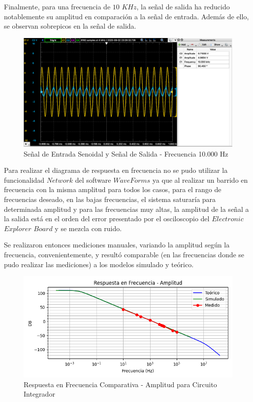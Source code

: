 Finalmente, para una frecuencia de $10$ $KHz$, la señal de salida ha reducido notablemente su amplitud en comparación a la señal de entrada.
Además de ello, se observan sobrepicos en la señal de salida.

\begin{figure}[H]
    \centering 
    \includegraphics [scale=0.4] {../Ejercicio3-CircuitoIntegradoresyDerivadores/Imagenes/senoidal - 10000.png} 
    \caption{Señal de Entrada Senoidal y Señal de Salida - Frecuencia 10.000 Hz}
    \label{fig:emptyPlotTool}
\end{figure}

Para realizar el diagrama de respuesta en frecuencia no se pudo utilizar la funcionalidad $Network$ del software $WaveForms$ ya que al realizar un barrido en frecuencia
con la misma amplitud para todos los casos, para el rango de frecuencias deseado, en las bajas frecuencias, el sistema saturaría para determinada amplitud y para las frecuencias muy altas, la amplitud de la señal a la salida
está en el orden del error presentado por el osciloscopio del $Electronic$ $Explorer$ $Board$ y se mezcla con ruido.

Se realizaron entonces mediciones manuales, variando la amplitud según la frecuencia, convenientemente, y resultó comparable (en las frecuencias donde se pudo realizar las mediciones)
a los modelos simulado y teórico.

\begin{figure}[H]
    \centering 
    \includegraphics [scale=0.6] {../Ejercicio3-CircuitoIntegradoresyDerivadores/Imagenes/comparativo-integrador-amplitud.png} 
    \caption{Respuesta en Frecuencia Comparativa - Amplitud para Circuito Integrador }
    \label{fig:emptyPlotTool}
\end{figure}

